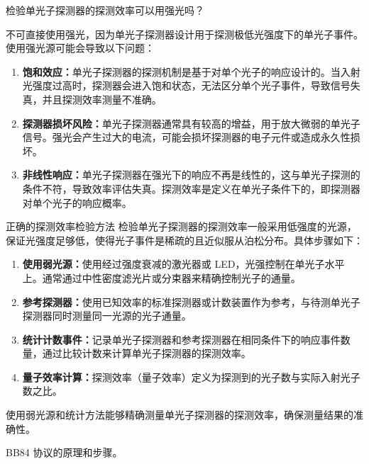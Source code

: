 \documentclass[dvipsnames, svgnames,a4paper,11pt]{article}
\begin{document}
\begin{question}
	检验单光子探测器的探测效率可以用强光吗？
\end{question}

	不可直接使用强光，因为单光子探测器设计用于探测极低光强度下的单光子事件。使用强光源可能会导致以下问题：

	\begin{enumerate}
		\item \textbf{饱和效应：}单光子探测器的探测机制是基于对单个光子的响应设计的。当入射光强度过高时，探测器会进入饱和状态，无法区分单个光子事件，导致信号失真，并且探测效率测量不准确。
		\item \textbf{探测器损坏风险：}单光子探测器通常具有较高的增益，用于放大微弱的单光子信号。强光会产生过大的电流，可能会损坏探测器的电子元件或造成永久性损坏。
		\item \textbf{非线性响应：}单光子探测器在强光下的响应不再是线性的，这与单光子探测的条件不符，导致效率评估失真。探测效率是定义在单光子条件下的，即探测器对单个光子的响应概率。
	\end{enumerate}
	

	正确的探测效率检验方法
	检验单光子探测器的探测效率一般采用低强度的光源，保证光强度足够低，使得光子事件是稀疏的且近似服从泊松分布。具体步骤如下：

	\begin{enumerate}
		\item \textbf{使用弱光源：}使用经过强度衰减的激光器或 LED，光强控制在单光子水平上。通常通过中性密度滤光片或分束器来精确控制光子的通量。
		\item \textbf{参考探测器：}使用已知效率的标准探测器或计数装置作为参考，与待测单光子探测器同时测量同一光源的光子通量。
		\item \textbf{统计计数事件：}记录单光子探测器和参考探测器在相同条件下的响应事件数量，通过比较计数来计算单光子探测器的探测效率。
		\item \textbf{量子效率计算：}探测效率（量子效率）定义为探测到的光子数与实际入射光子数之比。
	\end{enumerate}

	使用弱光源和统计方法能够精确测量单光子探测器的探测效率，确保测量结果的准确性。




\begin{question}
	BB84 协议的原理和步骤。
\end{question}
\end{document}
